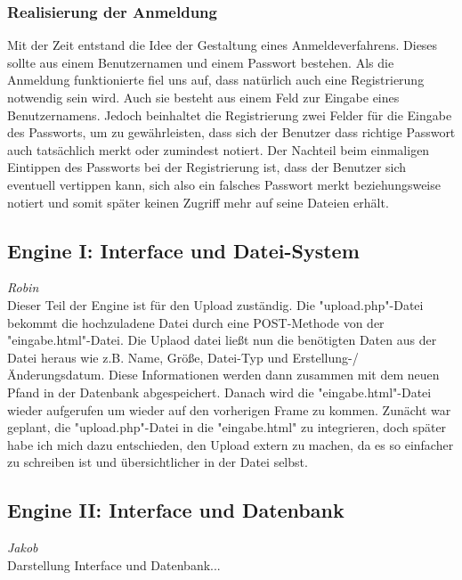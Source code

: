 \documentclass[12pt,a4paper,bibliography=totocnumbered,listof=totocnumbered]{scrartcl}
\begin{document}
\subsubsection{Realisierung der Anmeldung}
\label{RealisierungAnmeldung}
Mit der Zeit entstand die Idee der Gestaltung eines Anmeldeverfahrens. Dieses sollte aus einem Benutzernamen und einem Passwort bestehen. Als die Anmeldung funktionierte fiel uns auf, dass natürlich auch eine Registrierung notwendig sein wird. Auch sie besteht aus einem Feld zur Eingabe eines Benutzernamens. Jedoch beinhaltet die Registrierung zwei Felder für die Eingabe des Passworts, um zu gewährleisten, dass sich der Benutzer dass richtige Passwort auch tatsächlich merkt oder zumindest notiert. Der Nachteil beim einmaligen Eintippen des Passworts bei der Registrierung ist, dass der Benutzer sich eventuell vertippen kann, sich also ein falsches Passwort merkt beziehungsweise notiert und somit später keinen Zugriff mehr auf seine Dateien erhält.

\subsection{Engine I: Interface und Datei-System}
\emph{Robin}\\
Dieser Teil der Engine ist für den Upload zuständig. Die "upload.php"-Datei bekommt die hochzuladene Datei durch eine POST-Methode von der "eingabe.html"-Datei. Die Uplaod datei ließt nun die benötigten Daten aus der Datei heraus wie z.B. Name, Größe, Datei-Typ und Erstellung-/Änderungsdatum. Diese Informationen werden dann zusammen mit dem neuen Pfand in der Datenbank abgespeichert. Danach wird die "eingabe.html"-Datei wieder aufgerufen um wieder auf den vorherigen Frame zu kommen.
Zunächt war geplant, die "upload.php"-Datei in die "eingabe.html" zu integrieren, doch später habe ich mich dazu entschieden, den Upload extern zu machen, da es so einfacher zu schreiben ist und übersichtlicher in der Datei selbst.


\subsection{Engine II: Interface und Datenbank}
\emph{Jakob}\\
\label{sec:EngineII}
Darstellung Interface und Datenbank...
\pagebreak
\end{document}
